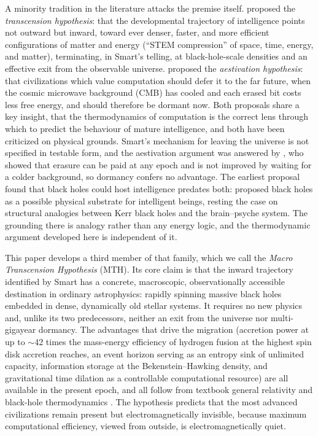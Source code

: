 \documentclass[11pt]{article}
\begin{document}
A minority tradition in the literature attacks the premise itself. \citet{Smart2012} proposed the \emph{transcension hypothesis}: that the developmental trajectory of intelligence points not outward but inward, toward ever denser, faster, and more efficient configurations of matter and energy (``STEM compression'' of space, time, energy, and matter), terminating, in Smart's telling, at black-hole-scale densities and an effective exit from the observable universe. \citet{Sandberg2016} proposed the \emph{aestivation hypothesis}: that civilizations which value computation should defer it to the far future, when the cosmic microwave background (CMB) has cooled and each erased bit costs less free energy, and should therefore be dormant now. Both proposals share a key insight, that the thermodynamics of computation is the correct lens through which to predict the behaviour of mature intelligence, and both have been criticized on physical grounds. Smart's mechanism for leaving the universe is not specified in testable form, and the aestivation argument was answered by \citet{Bennett2019}, who showed that erasure can be paid at any epoch and is not improved by waiting for a colder background, so dormancy confers no advantage. The earliest proposal found that black holes could host intelligence predates both: \citet{Lefebvre2000} proposed black holes as a possible physical substrate for intelligent beings, resting the case on structural analogies between Kerr black holes and the brain--psyche system. The grounding there is analogy rather than any energy logic, and the thermodynamic argument developed here is independent of it.

This paper develops a third member of that family, which we call the \emph{Macro Transcension Hypothesis} (MTH). Its core claim is that the inward trajectory identified by Smart has a concrete, macroscopic, observationally accessible destination in ordinary astrophysics: rapidly spinning massive black holes embedded in dense, dynamically old stellar systems. It requires no new physics and, unlike its two predecessors, neither an exit from the universe nor multi-gigayear dormancy. The advantages that drive the migration (accretion power at up to $\sim$42 times the mass-energy efficiency of hydrogen fusion at the highest spin disk accretion reaches, an event horizon serving as an entropy sink of unlimited capacity, information storage at the Bekenstein--Hawking density, and gravitational time dilation as a controllable computational resource) are all available in the present epoch, and all follow from textbook general relativity and black-hole thermodynamics \citep{MTW1973,BardeenPressTeukolsky1972,Bekenstein1973,Bekenstein1974}. The hypothesis predicts that the most advanced civilizations remain present but electromagnetically invisible, because maximum computational efficiency, viewed from outside, is electromagnetically quiet.
\end{document}
